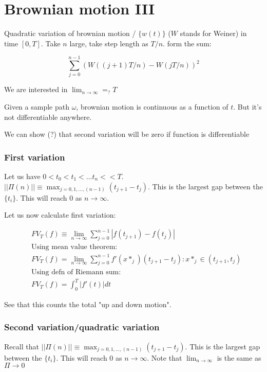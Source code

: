 \documentclass{book}
\theoremstyle{definition}
\begin{document}
\chapter{Brownian motion III}

Quadratic variation of brownian motion / $\{ w(t) \}$ ($W$ stands for Weiner)
in time $[0, T]$.  Take $n$ large, take step length as $T/n$. form the sum:

$$
\sum_{j=0}^{n-1} (W((j+1)T/n) - W(jT/n))^2
$$

We are interested in $\lim_{n \rightarrow \infty} =_? T$

Given a sample path $\omega$, brownian motion is continuous as a function of $t$.
But it's not differentiable anywhere.

We can show (?) that second variation will be zero if function is differentiable

\subsection{First variation}
Let us have $0 < t_0 < t_1 < \dots t_n < < T$.
$||\Pi(n)|| \equiv \max_{j=0,1,\dots,(n-1)} (t_{j+1} - t_j)$. This is the largest
gap between the $\{ t_i \}$. This will reach $0$ as $n \rightarrow \infty$.

Let us now calculate first variation:

\begin{align*}
&FV_T(f) \equiv  \lim_{n \rightarrow \infty} \sum_{j=0}^{n-1}|f(t_{j+1}) - f(t_j)|  \\
&\text{Using mean value theorem:} \\
&FV_T(f) =  \lim_{n \rightarrow \infty} \sum_{j=0}^{n-1}f'(x*_j) (t_{j+1} - t_j) : x*_j \in (t_{j+1}, t_j) \\
&\text{Using defn of Riemann sum:} \\
&FV_T(f) =  \int_0^T |f'(t)| dt
\end{align*}

See that this counts the total "up and down motion".

\subsection{Second variation/quadratic variation}
Recall that $||\Pi(n)|| \equiv \max_{j=0,1,\dots,(n-1)} (t_{j+1} - t_j)$. This is the largest
gap between the $\{ t_i \}$. This will reach $0$ as $n \rightarrow \infty$.
Note that $\lim_{n \rightarrow \infty}$ is the same as $\Pi \rightarrow 0$
\end{document}

